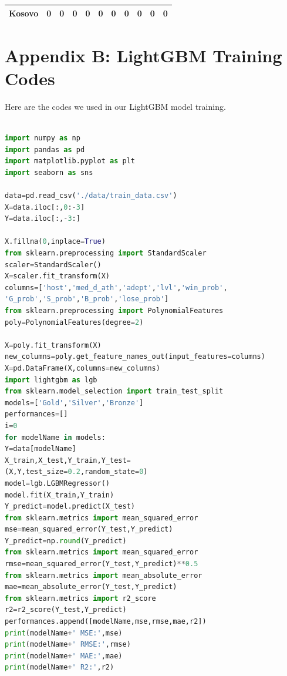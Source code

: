 \documentclass[12pt]{article}  %
\begin{document}
\begin{subappendices}
\begin{longtable}{|l|c|c|c|c|c|c|c|c|c|c|}
	\hline
	Kosovo                                                         & 0                                                                      & 0                                                                      & 0                                                                      & 0                                                                      & 0                                                                      & 0                                                                      & 0                         & 0                           & 0                           & 0                           \\
	\hline
\end{longtable}


\clear
\section{Appendix B: LightGBM Training Codes}
Here are the codes we used in our LightGBM model training.




\begin{lstlisting}[language=Python, name={LightGBM.py}]

import numpy as np
import pandas as pd
import matplotlib.pyplot as plt
import seaborn as sns

data=pd.read_csv('./data/train_data.csv')
X=data.iloc[:,0:-3]
Y=data.iloc[:,-3:]

X.fillna(0,inplace=True)
from sklearn.preprocessing import StandardScaler
scaler=StandardScaler()
X=scaler.fit_transform(X)
columns=['host','med_d_ath','adept','lvl','win_prob',
'G_prob','S_prob','B_prob','lose_prob']
from sklearn.preprocessing import PolynomialFeatures
poly=PolynomialFeatures(degree=2)

X=poly.fit_transform(X)
new_columns=poly.get_feature_names_out(input_features=columns)
X=pd.DataFrame(X,columns=new_columns)
import lightgbm as lgb
from sklearn.model_selection import train_test_split
models=['Gold','Silver','Bronze']
performances=[]
i=0
for modelName in models:
Y=data[modelName]
X_train,X_test,Y_train,Y_test=
(X,Y,test_size=0.2,random_state=0)
model=lgb.LGBMRegressor()
model.fit(X_train,Y_train)
Y_predict=model.predict(X_test)
from sklearn.metrics import mean_squared_error
mse=mean_squared_error(Y_test,Y_predict)
Y_predict=np.round(Y_predict)
from sklearn.metrics import mean_squared_error
rmse=mean_squared_error(Y_test,Y_predict)**0.5
from sklearn.metrics import mean_absolute_error
mae=mean_absolute_error(Y_test,Y_predict)
from sklearn.metrics import r2_score
r2=r2_score(Y_test,Y_predict)
performances.append([modelName,mse,rmse,mae,r2])
print(modelName+' MSE:',mse)
print(modelName+' RMSE:',rmse)
print(modelName+' MAE:',mae)
print(modelName+' R2:',r2)


\end{lstlisting}
\end{subappendices}
\end{document}
